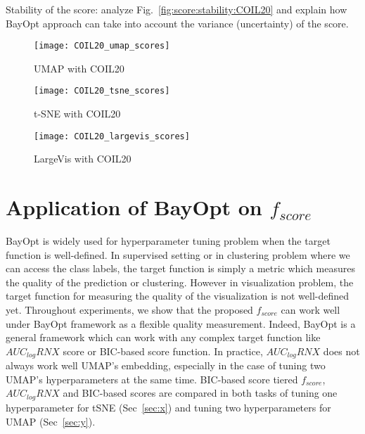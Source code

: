 Stability of the score: analyze Fig.~\ref{fig:score:stability:COIL20} and explain how BayOpt approach can take into account the variance (uncertainty) of the score.

\begin{figure*}[pos=h]
     \centering
     \begin{subfigure}[b]{0.32\textwidth}
         \centering
         \texttt{[image: COIL20\_umap\_scores]}
         \caption{UMAP with COIL20}
     \end{subfigure}
     \hfill
     \begin{subfigure}[b]{0.32\textwidth}
         \centering
         \texttt{[image: COIL20\_tsne\_scores]}
         \caption{t-SNE with COIL20}
     \end{subfigure}
     \hfill
     \begin{subfigure}[b]{0.32\textwidth}
         \centering
         \texttt{[image: COIL20\_largevis\_scores]}
         \caption{LargeVis with COIL20}
     \end{subfigure}
     \caption{Stability of the constraint preserving scores with three methods UMAP, t-SNE and LargeVis for COIL20 dataset.}
     \label{fig:score:stability:COIL20}
\end{figure*}


\section{Application of BayOpt on $f_{score}$}
BayOpt is widely used for hyperparameter tuning problem when the target function is well-defined.
In supervised setting or in clustering problem where we can access the class labels, the target function is simply a metric which measures the quality of the prediction or clustering.
However in visualization problem, the target function for measuring the quality of the visualization is not well-defined yet.
Throughout experiments, we show that the proposed $f_{score}$ can work well under BayOpt framework as a flexible quality measurement.
Indeed, BayOpt is a general framework which can work with any complex target function like $AUC_{log}RNX$ score or BIC-based score function.
In practice, $AUC_{log}RNX$ does not always work well UMAP's embedding, especially in the case of tuning two UMAP's hyperparameters at the same time.
BIC-based score tiered 
$f_{score}$, $AUC_{log}RNX$ and BIC-based scores are compared in both tasks of tuning one hyperparameter for tSNE (Sec~\ref{sec:x}) and tuning two hyperparameters for UMAP (Sec~\ref{sec:y}).

